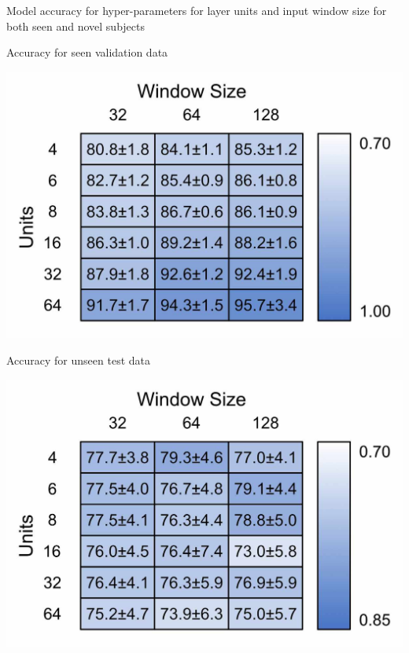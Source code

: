 \documentclass[sensors,article,submit,moreauthors,pdftex]{Definitions/mdpi}
\begin{document}
\begin{table}[!hbt]
    \centering
    \caption{Model accuracy for hyper-parameters for layer units and input window size for both seen and novel subjects}
    \label{tab:model_size_hyper_param}
    \begin{subtable}{.4\linewidth}
        \centering
        \caption{Accuracy for seen validation data}
        \label{tab:model_size_hyper_param_train}
        \includegraphics[width=\textwidth]{Figures/results/window_v_units_train.jpg}
    \end{subtable}
    \hfil
    \begin{subtable}{.4\linewidth}
        \centering
        \caption{Accuracy for unseen test data}
        \label{tab:model_size_hyper_param_test}
        \includegraphics[width=\textwidth]{Figures/results/window_v_units_test.jpg}
    \end{subtable}
\end{table}
\end{document}
